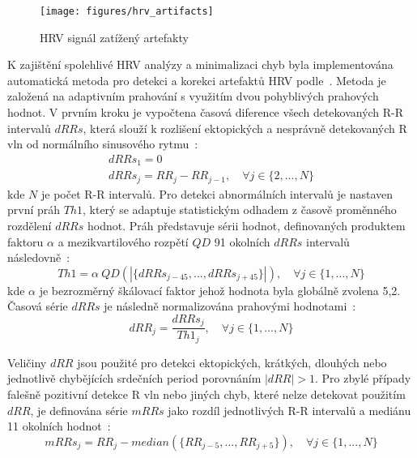 \begin{figure}[h]
    \begin{center}
        \texttt{[image: figures/hrv\_artifacts]}
        \caption{HRV signál zatížený artefakty}
        \label{fig:hrv_artifacts}
    \end{center}
\end{figure}

K zajištění spolehlivé HRV analýzy a minimalizaci chyb byla implementována
automatická metoda pro detekci a korekci artefaktů HRV
podle~\cite{Lipponen2019}. Metoda je založená na adaptivním prahování s využitím
dvou pohyblivých prahových hodnot. V prvním kroku je vypočtena časová diference
všech detekovaných R-R intervalů $dRRs$, která slouží k rozlišení ektopických a
nesprávně detekovaných R vln od normálního sinusového rytmu~\cite{Lipponen2019}:
\begin{gather}
    dRRs_1 = 0 \nonumber \\
    dRRs_j = RR_j - RR_{j-1}, \quad \forall j \in \{2,...,N\}
\end{gather}
kde $N$ je počet R-R intervalů. Pro detekci abnormálních intervalů je nastaven
první práh $Th1$, který se adaptuje statistickým odhadem z časově proměnného
rozdělení $dRRs$ hodnot. Práh představuje sérii hodnot, definovaných produktem
faktoru $\alpha$ a mezikvartilového rozpětí $QD$ 91 okolních $dRRs$ intervalů
následovně~\cite{Lipponen2019}:
\begin{equation}
    Th1 = \alpha~QD(|\{dRRs_{j-45},...,dRRs_{j+45}\}|), \quad \forall j \in \{1,...,N\}
\end{equation}
kde $\alpha$ je bezrozměrný škálovací faktor jehož hodnota byla globálně zvolena
5,2. Časová série $dRRs$ je následně normalizována prahovými
hodnotami~\cite{Lipponen2019}:
\begin{equation}
    dRR_j = \frac{dRRs_j}{Th1_j}, \quad \forall j \in \{1,...,N\}
\end{equation}

Veličiny $dRR$ jsou použité pro detekci ektopických, krátkých, dlouhých nebo
jednotlivě chybějících srdečních period porovnáním $|dRR|>1$. Pro zbylé případy
falešně pozitivní detekce R vln nebo jiných chyb, které nelze detekovat použitím
$dRR$, je definována série $mRRs$ jako rozdíl jednotlivých R-R intervalů a
mediánu 11 okolních hodnot~\cite{Lipponen2019}:
\begin{equation}
    mRRs_j = RR_j - median(\{RR_{j-5},...,RR_{j+5}\}), \quad \forall j \in \{1,...,N\}
\end{equation}

